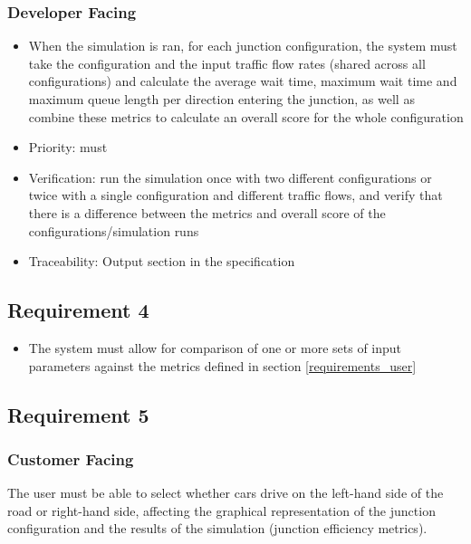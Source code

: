 \documentclass{article}
\begin{document}
\subsubsection{Developer Facing}
\begin{itemize}
  \item When the simulation is ran, for each junction configuration, the system 
  must take the configuration and the input traffic flow rates (shared across all 
  configurations) and calculate the average wait time, maximum wait time and 
  maximum queue length per direction entering the junction, as well as combine 
  these metrics to calculate an overall score for the whole configuration
  \item Priority: must
  \item Verification: run the simulation once with two different configurations 
  or twice with a single configuration and different traffic flows, and verify 
  that there is a difference between the metrics and overall score of the 
  configurations/simulation runs
  \item Traceability: Output section in the specification
\end{itemize}

\subsection{Requirement 4}
\begin{itemize}
  \item The system must allow for comparison of one or more sets of input parameters against the metrics defined in section \ref{requirements_user}
\end{itemize}

\subsection{Requirement 5}
\subsubsection{Customer Facing}
The user must be able to select whether cars drive on the left-hand side of 
the road or right-hand side, affecting the graphical representation of the junction
configuration and the results of the simulation (junction efficiency metrics).
\end{document}
